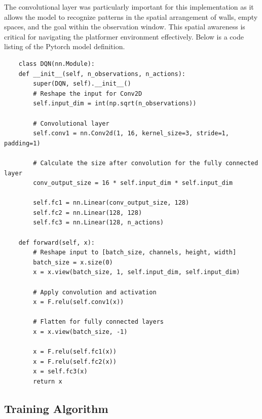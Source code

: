 The convolutional layer was particularly important for this implementation as it allows the model to recognize patterns in the spatial arrangement of walls, empty spaces, and the goal within the observation window. 
This spatial awareness is critical for navigating the platformer environment effectively. Below is a code listing of the Pytorch model definition.
\singlespaced
\begin{verbatim}
    class DQN(nn.Module):
    def __init__(self, n_observations, n_actions):
        super(DQN, self).__init__()
        # Reshape the input for Conv2D
        self.input_dim = int(np.sqrt(n_observations))
        
        # Convolutional layer
        self.conv1 = nn.Conv2d(1, 16, kernel_size=3, stride=1, padding=1)
        
        # Calculate the size after convolution for the fully connected layer
        conv_output_size = 16 * self.input_dim * self.input_dim
        
        self.fc1 = nn.Linear(conv_output_size, 128)
        self.fc2 = nn.Linear(128, 128)
        self.fc3 = nn.Linear(128, n_actions)
        
    def forward(self, x):
        # Reshape input to [batch_size, channels, height, width]
        batch_size = x.size(0)
        x = x.view(batch_size, 1, self.input_dim, self.input_dim)
        
        # Apply convolution and activation
        x = F.relu(self.conv1(x))
        
        # Flatten for fully connected layers
        x = x.view(batch_size, -1)
        
        x = F.relu(self.fc1(x))
        x = F.relu(self.fc2(x))
        x = self.fc3(x)
        return x
\end{verbatim}
\doublespaced

\subsection{Training Algorithm}

